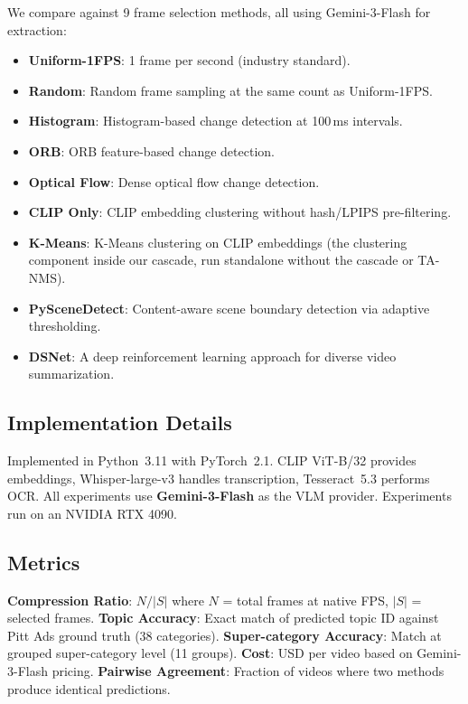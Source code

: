 We compare against 9 frame selection methods, all using Gemini-3-Flash for extraction:
\begin{itemize}
    \item \textbf{Uniform-1FPS}: 1 frame per second (industry standard).
    \item \textbf{Random}: Random frame sampling at the same count as Uniform-1FPS.
    \item \textbf{Histogram}: Histogram-based change detection at 100\,ms intervals.
    \item \textbf{ORB}: ORB feature-based change detection.
    \item \textbf{Optical Flow}: Dense optical flow change detection.
    \item \textbf{CLIP Only}: CLIP embedding clustering without hash/LPIPS pre-filtering.
    \item \textbf{K-Means}: K-Means clustering on CLIP embeddings (the clustering component inside our cascade, run standalone without the cascade or TA-NMS).
    \item \textbf{PySceneDetect}: Content-aware scene boundary detection via adaptive thresholding.
    \item \textbf{DSNet}: A deep reinforcement learning approach for diverse video summarization.
\end{itemize}


\subsection{Implementation Details}

Implemented in Python~3.11 with PyTorch~2.1. CLIP ViT-B/32 provides embeddings, Whisper-large-v3 handles transcription, Tesseract~5.3 performs OCR. All experiments use \textbf{Gemini-3-Flash} as the VLM provider. Experiments run on an NVIDIA RTX 4090.


\subsection{Metrics}

\textbf{Compression Ratio}: $N / |S|$ where $N$ = total frames at native FPS, $|S|$ = selected frames.
\textbf{Topic Accuracy}: Exact match of predicted topic ID against Pitt Ads ground truth (38 categories).
\textbf{Super-category Accuracy}: Match at grouped super-category level (11 groups).
\textbf{Cost}: USD per video based on Gemini-3-Flash pricing.
\textbf{Pairwise Agreement}: Fraction of videos where two methods produce identical predictions.
